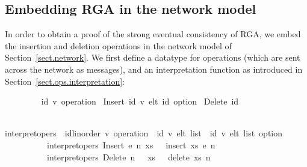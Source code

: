 \subsection{Embedding RGA in the network model}

In order to obtain a proof of the strong eventual consistency of RGA, we embed the insertion and deletion operations in the network model of Section~\ref{sect.network}.
We first define a datatype for operations (which are sent across the network as messages), and an interpretation function as introduced in Section~\ref{sect.ops.interpretation}:
\vspace{0.35em}
\begin{isabellebody}
\ \ \ \ \ \ \ \  {\isacharparenleft}{\isacharprime}id{\isacharcomma}\ {\isacharprime}v{\isacharparenright}\ operation\ {\isacharequal} Insert\ {\isachardoublequoteopen}{\isacharparenleft}{\isacharprime}id{\isacharcomma}\ {\isacharprime}v{\isacharparenright}\ elt{\isachardoublequoteclose}\ {\isachardoublequoteopen}{\isacharprime}id\ option{\isachardoublequoteclose}\ {\isacharbar} Delete\ {\isachardoublequoteopen}{\isacharprime}id{\isachardoublequoteclose}
\end{isabellebody}
\vspace{0.35em}
\begin{isabellebody}
\ \ \ \ \ \ \ \  interpret{\isacharunderscore}opers\ {\isacharcolon}{\isacharcolon}\ {\isachardoublequoteopen}{\isacharparenleft}{\isacharprime}id{\isacharcolon}{\isacharcolon}linorder{\isacharcomma}\ {\isacharprime}v{\isacharparenright}\ operation\ {\isasymRightarrow}\ {\isacharparenleft}{\isacharprime}id{\isacharcomma}\ {\isacharprime}v{\isacharparenright}\ elt\ list\ {\isasymRightarrow}\ {\isacharparenleft}{\isacharprime}id{\isacharcomma}\ {\isacharprime}v{\isacharparenright}\ elt\ list\ option{\isachardoublequoteclose}\ \isanewline
\ \ \ \ \ \ \ \ \ \ {\isachardoublequoteopen}interpret{\isacharunderscore}opers\ {\isacharparenleft}Insert\ e\ n{\isacharparenright}\ xs\ \ {\isacharequal}\ insert\ xs\ e\ n{\isachardoublequoteclose}\ {\isacharbar}\isanewline
\ \ \ \ \ \ \ \ \ \ {\isachardoublequoteopen}interpret{\isacharunderscore}opers\ {\isacharparenleft}Delete\ n{\isacharparenright}\ \ \ xs\ \ {\isacharequal}\ delete\ xs\ n{\isachardoublequoteclose}
\end{isabellebody}
\vspace{0.35em}

